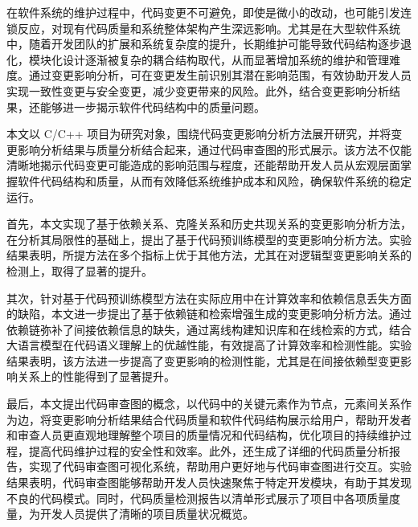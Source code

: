 \begin{cabstract}

在软件系统的维护过程中，代码变更不可避免，即使是微小的改动，也可能引发连锁反应，对现有代码质量和系统整体架构产生深远影响。尤其是在大型软件系统中，随着开发团队的扩展和系统复杂度的提升，长期维护可能导致代码结构逐步退化，模块化设计逐渐被复杂的耦合结构取代，从而显著增加系统的维护和管理难度。通过变更影响分析，可在变更发生前识别其潜在影响范围，有效协助开发人员实现一致性变更与安全变更，减少变更带来的风险。此外，结合变更影响分析结果，还能够进一步揭示软件代码结构中的质量问题。

本文以 C/C++ 项目为研究对象，围绕代码变更影响分析方法展开研究，并将变更影响分析结果与质量分析结合起来，通过代码审查图的形式展示。该方法不仅能清晰地揭示代码变更可能造成的影响范围与程度，还能帮助开发人员从宏观层面掌握软件代码结构和质量，从而有效降低系统维护成本和风险，确保软件系统的稳定运行。

首先，本文实现了基于依赖关系、克隆关系和历史共现关系的变更影响分析方法，在分析其局限性的基础上，提出了基于代码预训练模型的变更影响分析方法。实验结果表明，所提方法在多个指标上优于其他方法，尤其在对逻辑型变更影响关系的检测上，取得了显著的提升。

其次，针对基于代码预训练模型方法在实际应用中在计算效率和依赖信息丢失方面的缺陷，本文进一步提出了基于依赖链和检索增强生成的变更影响分析方法。通过依赖链弥补了间接依赖信息的缺失，通过离线构建知识库和在线检索的方式，结合大语言模型在代码语义理解上的优越性能，有效提高了计算效率和检测性能。实验结果表明，该方法进一步提高了变更影响的检测性能，尤其是在间接依赖型变更影响关系上的性能得到了显著提升。

最后，本文提出代码审查图的概念，以代码中的关键元素作为节点，元素间关系作为边，将变更影响分析结果结合代码质量和软件代码结构展示给用户，帮助开发者和审查人员更直观地理解整个项目的质量情况和代码结构，优化项目的持续维护过程，提高代码维护过程的安全性和效率。此外，还生成了详细的代码质量分析报告，实现了代码审查图可视化系统，帮助用户更好地与代码审查图进行交互。实验结果表明，代码审查图能够帮助开发人员快速聚焦于特定开发模块，有助于其发现不良的代码模式。同时，代码质量检测报告以清单形式展示了项目中各项质量度量，为开发人员提供了清晰的项目质量状况概览。

\end{cabstract}

